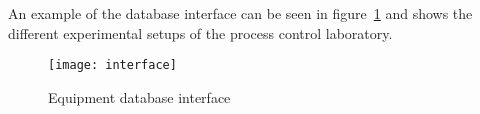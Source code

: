 An example of the database interface can be seen in figure~\ref{fig:docu:interface} and shows the different experimental setups of the process control laboratory.
\begin{figure}[htbp]
	\centering
	\texttt{[image: interface]}
	\caption{Equipment database interface}
	\label{fig:docu:interface}
\end{figure}